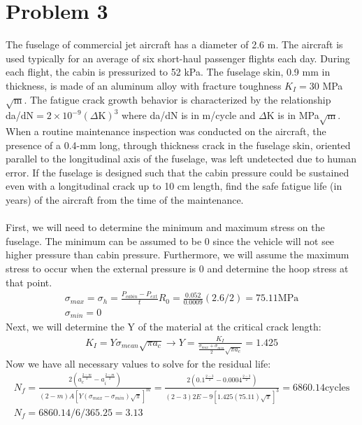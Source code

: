 \documentclass[12 pt]{article}
\begin{document}
\pagebreak
\section*{Problem 3}
The fuselage of commercial jet aircraft has a diameter of 2.6 m. The aircraft is used typically for
an average of six short-haul passenger flights each day. During each flight, the cabin is pressurized
to 52 kPa. The fuselage skin, 0.9 mm in thickness, is made of an aluminum alloy with fracture
toughness $K_I=30$ MPa$\sqrt{\text{m}}$. The fatigue crack growth behavior is characterized by the relationship
da/dN$=2\times10^{-9}(\Delta\text{K})^3$ where da/dN is in m/cycle and $\Delta$K is in MPa$\sqrt{\text{m}}$. When a routine maintenance
inspection was conducted on the aircraft, the presence of a 0.4-mm long, through thickness crack
in the fuselage skin, oriented parallel to the longitudinal axis of the fuselage, was left undetected
due to human error. If the fuselage is designed such that the cabin pressure could be sustained
even with a longitudinal crack up to 10 cm length, find the safe fatigue life (in years) of the aircraft
from the time of the maintenance. \\ \\
First, we will need to determine the minimum and maximum stress on the fuselage. The minimum can be assumed to be 0
since the vehicle will not see higher pressure than cabin pressure. Furthermore, we will assume the maximum stress to
occur when the external pressure is 0 and determine the hoop stress at that point.
\begin{align*}
    \sigma_{max}=\sigma_h=\frac{P_{cabin}-P_{ext}}{t}R_0=\frac{0.052}{0.0009}(2.6/2)=75.11\text{MPa} \\
    \sigma_{min}=0
\end{align*}
Next, we will determine the Y of the material at the critical crack length:
\begin{align*}
    K_I=Y\sigma_{mean}\sqrt{\pi a_c} \rightarrow Y=\frac{K_I}{\frac{\sigma_{max}+\sigma_{min}}{2}\sqrt{\pi a_c}}=1.425
\end{align*}
Now we have all necessary values to solve for the residual life:
\begin{align*}
    N_f=\frac{2\left(a_c^{\frac{2-m}{2}}-a_i^{\frac{2-m}{2}}\right)}{(2-m)A[Y(\sigma_{max}-\sigma_{min})\sqrt{\pi}]^m}
    =\frac{2\left(0.1^{\frac{2-3}{2}}-0.0004^{\frac{2-3}{2}}\right)}{(2-3)2E-9[1.425(75.11)\sqrt{\pi}]^3}=6860.14\text{cycles} \\
    N_f=6860.14/6/365.25=3.13
\end{align*}
\end{document}
